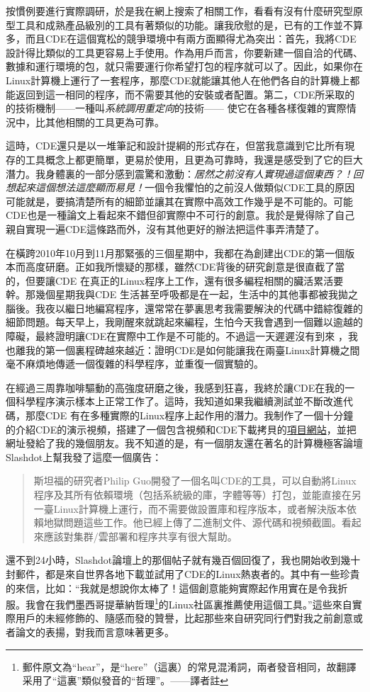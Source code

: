 \documentclass[12pt,UTF8,nofonts]{book}
\begin{document}
按慣例要進行實際調研，於是我在網上搜索了相關工作，看看有沒有什麼研究型原型工具和成熟產品級別的工具有著類似的功能。讓我欣慰的是，已有的工作並不算多，而且CDE在這個寬松的競爭環境中有兩方面顯得尤為突出：首先，我將CDE設計得比類似的工具更容易上手使用。作為用戶而言，你要新建一個自洽的代碼、數據和運行環境的包，就只需要運行你希望打包的程序就可以了。因此，如果你在Linux計算機上運行了一套程序，那麼CDE就能讓其他人在他們各自的計算機上都能返回到這一相同的程序，而不需要其他的安裝或者配置。第二，CDE所采取的的技術機制——一種叫\emph{系統調用重定向}的技術—— 使它在各種各樣復雜的實際情況中，比其他相關的工具更為可靠。

這時，CDE還只是以一堆筆記和設計提綱的形式存在，但當我意識到它比所有現存的工具概念上都更簡單，更易於使用，且更為可靠時，我還是感受到了它的巨大潛力。我身體裏的一部分感到震驚和激動：\emph{居然之前沒有人實現過這個東西？！回想起來這個想法這麼顯而易見！}一個令我懼怕的之前沒人做類似CDE工具的原因可能就是，要搞清楚所有的細節並讓其在實際中高效工作幾乎是不可能的。可能CDE也是一種論文上看起來不錯但卻實際中不可行的創意。我於是覺得除了自己親自實現一遍CDE這條路而外，沒有其他更好的辦法把這件事弄清楚了。

在橫跨2010年10月到11月那緊張的三個星期中，我都在為創建出CDE的第一個版本而高度研磨。正如我所懷疑的那樣，雖然CDE背後的研究創意是很直截了當的，但要讓CDE 在真正的Linux程序上工作，還有很多編程相關的臟活累活要幹。那幾個星期我與CDE 生活甚至呼吸都是在一起，生活中的其他事都被我拋之腦後。我夜以繼日地編寫程序，還常常在夢裏思考我需要解決的代碼中錯綜復雜的細節問題。每天早上，我剛醒來就跳起來編程，生怕今天我會遇到一個難以逾越的障礙，最終證明讓CDE在實際中工作是不可能的。不過這一天遲遲沒有到來 ，我也離我的第一個裏程碑越來越近：證明CDE是如何能讓我在兩臺Linux計算機之間毫不麻煩地傳遞一個復雜的科學程序，並重復一個實驗的。

在經過三周靠咖啡驅動的高強度研磨之後，我感到狂喜，我終於讓CDE在我的一個科學程序演示樣本上正常工作了。這時，我知道如果我繼續測試並不斷改進代碼，那麼CDE 有在多種實際的Linux程序上起作用的潛力。我制作了一個十分鐘的介紹CDE的演示視頻，搭建了一個包含視頻和CDE下載拷貝的\href{http://www.pgbovine.net/cde.html}{項目網站}，並把網址發給了我的幾個朋友。我不知道的是，有一個朋友還在著名的計算機極客論壇Slashdot上幫我發了這麼一個廣告：
\begin{quote}
  斯坦福的研究者Philip Guo開發了一個名叫CDE的工具，可以自動將Linux程序及其所有依賴環境（包括系統級的庫，字體等等）打包，並能直接在另一臺Linux計算機上運行，而不需要做設置庫和程序版本，或者解決版本依賴地獄問題這些工作。他已經上傳了二進制文件、源代碼和視頻截圖。看起來應該對集群/雲部署和程序共享有很大幫助。
\end{quote}
還不到24小時，Slashdot論壇上的那個帖子就有幾百個回復了，我也開始收到幾十封郵件，都是來自世界各地下載並試用了CDE的Linux熱衷者的。其中有一些珍貴的來信，比如：“我就是想說你太棒了！這個創意能夠實際起作用實在是令我折服。我會在我們墨西哥提華納哲理\footnote{郵件原文為``hear''，是``here''（這裏）的常見混淆詞，兩者發音相同，故翻譯采用了“這裏”類似發音的“哲理”。——譯者註}的Linux社區裏推薦使用這個工具。”這些來自實際用戶的未經修飾的、隨感而發的贊譽，比起那些來自研究同行們對我之前創意或者論文的表揚，對我而言意味著更多。
\end{document}
